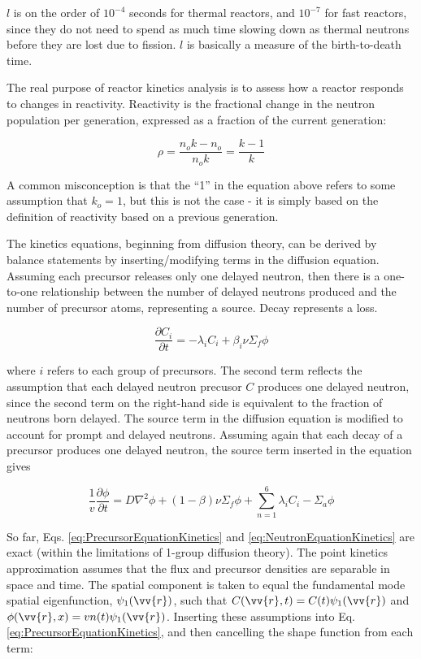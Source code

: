 \documentclass[10pt]{article}
\begin{document}
\begin{flushleft}
\(l\) is on the order of \(10^{-4}\) seconds for thermal reactors, and \(10^{-7}\) for fast reactors, since they do not need to spend as much time slowing down as thermal neutrons before they are lost due to fission. \(l\) is basically a measure of the birth-to-death time.

The real purpose of reactor kinetics analysis is to assess how a reactor responds to changes in reactivity. Reactivity is the fractional change in the neutron population per generation, expressed as a fraction of the current generation:

\begin{equation}
\label{eq:Reactivity}
\rho=\frac{n_ok-n_o}{n_ok}=\frac{k-1}{k}
\end{equation}

A common misconception is that the ``1'' in the equation above refers to some assumption that \(k_o=1\), but this is not the case - it is simply based on the definition of reactivity based on a previous generation.

The kinetics equations, beginning from diffusion theory, can be derived by balance statements by inserting/modifying terms in the diffusion equation. Assuming each precursor releases only one delayed neutron, then there is a one-to-one relationship between the number of delayed neutrons produced and the number of precursor atoms, representing a source. Decay represents a loss. 

\begin{equation}
\label{eq:PrecursorEquationKinetics}
\frac{\partial C_i}{\partial t}=-\lambda_i C_i + \beta_i \nu\Sigma_f\phi
\end{equation} 

where \(i\) refers to each group of precursors. The second term reflects the assumption that each delayed neutron precusor \(C\) produces one delayed neutron, since the second term on the right-hand side is equivalent to the fraction of neutrons born delayed. The source term in the diffusion equation is modified to account for prompt and delayed neutrons. Assuming again that each decay of a precursor produces one delayed neutron, the source term inserted in the equation gives

\begin{equation}
\label{eq:NeutronEquationKinetics}
\frac{1}{v}\frac{\partial\phi}{\partial t}=D\nabla^2\phi + (1-\beta)\nu\Sigma_f\phi + \sum_{n=1}^{6} \lambda_i C_i -\Sigma_a\phi
\end{equation} 

So far, Eqs. \ref{eq:PrecursorEquationKinetics} and \ref{eq:NeutronEquationKinetics} are exact (within the limitations of 1-group diffusion theory). The point kinetics approximation assumes that the flux and precursor densities are separable in space and time. The spatial component is taken to equal the fundamental mode spatial eigenfunction, \(\psi_1(\vv{r})\), such that \(C(\vv{r},t) = C(t)\psi_1(\vv{r})\) and \(\phi(\vv{r},x)=vn(t)\psi_1(\vv{r})\). Inserting these assumptions into Eq. \ref{eq:PrecursorEquationKinetics}, and then cancelling the shape function from each term:


\end{flushleft}
\end{document}
